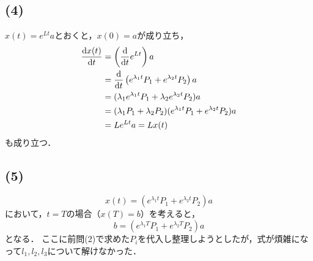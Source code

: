 \documentclass[a4paper,11pt]{jsarticle}
\begin{document}
\subsection*{(4)}
$x(t) = e^{Lt}a$とおくと，$x(0)=a$が成り立ち，
\begin{align}
  \dv{x(t)}{t} &= \left(\dv{}{t} e^{Lt}\right)a  \notag\\
  &= \dv{}{t} \left(e^{\lambda_1t}P_1+e^{\lambda_2t}P_2\right)a \notag\\
  &= (\lambda_1e^{\lambda_1t}P_1 + \lambda_2e^{\lambda_2t}P_2)a \notag\\
  &= (\lambda_1P_1+\lambda_2P_2)(e^{\lambda_1t}P_1+e^{\lambda_2t}P_2) a \notag\\
  &= Le^{Lt}a = Lx(t)
\end{align}
も成り立つ．

\subsection*{(5)}
\begin{equation}
  x(t) = (e^{\lambda_1 t}P_1 + e^{\lambda_2 t}P_2)a
\end{equation}
において，$t=T$の場合（$x(T)=b$）を考えると，
\begin{equation}
  b = (e^{\lambda_1 T}P_1 + e^{\lambda_2 T}P_2)a
\end{equation}
となる．
ここに前問(2)で求めた$P_i$を代入し整理しようとしたが，式が煩雑になって$l_1,l_2,l_3$について解けなかった．
\end{document}
